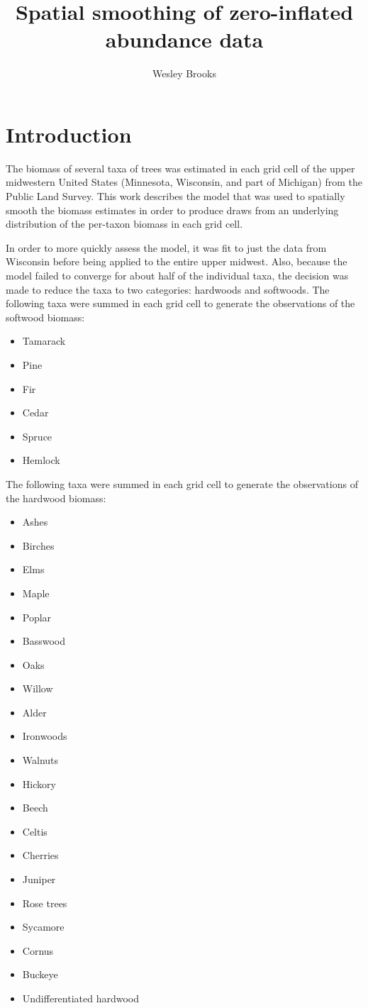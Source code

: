 \documentclass[authoryear, review, 11pt]{elsarticle}
\title{Spatial smoothing of zero-inflated abundance data}
\author{Wesley Brooks}
\begin{document}
\maketitle

\section{Introduction}
The biomass of several taxa of trees was estimated in each grid cell of the upper midwestern United States (Minnesota, Wisconsin, and part of Michigan) from the Public Land Survey. This work describes the model that was used to spatially smooth the biomass estimates in order to produce draws from an underlying distribution of the per-taxon biomass in each grid cell.

In order to more quickly assess the model, it was fit to just the data from Wisconsin before being applied to the entire upper midwest. Also, because the model failed to converge for about half of the individual taxa, the decision was made to reduce the taxa to two categories: hardwoods and softwoods. The following taxa were summed in each grid cell to generate the observations of the softwood biomass:
\begin{itemize}
 \item Tamarack
 \item Pine
 \item Fir
 \item Cedar
 \item Spruce
 \item Hemlock
\end{itemize}

The following taxa were summed in each grid cell to generate the observations of the hardwood biomass:
\begin{itemize}
 \item Ashes
 \item Birches
 \item Elms
 \item Maple
 \item Poplar
 \item Basswood
 \item Oaks
 \item Willow
 \item Alder
 \item Ironwoods
 \item Walnuts
 \item Hickory
 \item Beech
 \item Celtis
 \item Cherries
 \item Juniper
 \item Rose trees
 \item Sycamore
 \item Cornus
 \item Buckeye
 \item Undifferentiated hardwood
\end{itemize}
\end{document}
